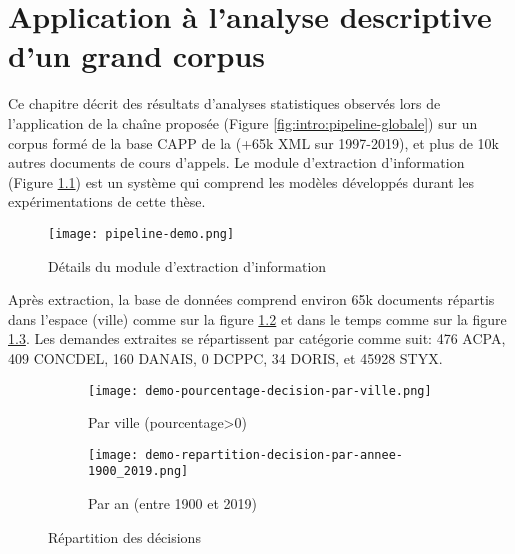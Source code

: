 \chapter{Application à l'analyse descriptive d'un grand corpus}
\label{chap:demo}
Ce chapitre décrit des résultats d'analyses statistiques observés lors de l'application de la chaîne proposée (Figure \ref{fig:intro:pipeline-globale}) sur un corpus formé de la base CAPP de la \citet{dila2019capp} (+65k XML sur 1997-2019), et plus de 10k autres documents de cours d'appels. Le module d'extraction d'information (Figure \ref{fig:demo:module-extraction}) est un système qui comprend les modèles développés durant les expérimentations de cette thèse. 



\begin{figure}[!htb]
	\centering 
	\texttt{[image: pipeline-demo.png]}
	\caption{Détails du module d'extraction d'information}\label{fig:demo:module-extraction}
\end{figure}

Après extraction, la base de données comprend environ 65k documents répartis dans l'espace (ville) comme sur la figure \ref{fig:demo:doc-per-city} et dans le temps comme sur la figure \ref{fig:demo:doc-per-year}. Les demandes extraites se répartissent par catégorie comme suit: 476 ACPA, 409 CONCDEL, 160 DANAIS, 0 DCPPC, 34 DORIS, et 45928 STYX.  

\begin{figure}[ht]
	\centering
	\begin{subfigure}[ht]{0.5\textwidth}
		\centering
		\centering
		\texttt{[image: demo-pourcentage-decision-par-ville.png]}
		\caption{Par ville (pourcentage>0)} \label{fig:demo:doc-per-city}
	\end{subfigure} 
	\begin{subfigure}[ht]{0.45\textwidth}
		\centering
		\texttt{[image: demo-repartition-decision-par-annee-1900\_2019.png]}
		\caption{Par an (entre 1900 et 2019)} \label{fig:demo:doc-per-year}
	\end{subfigure}
	\caption{Répartition des décisions} \label{fig:structuration:learning-curves}
\end{figure}


